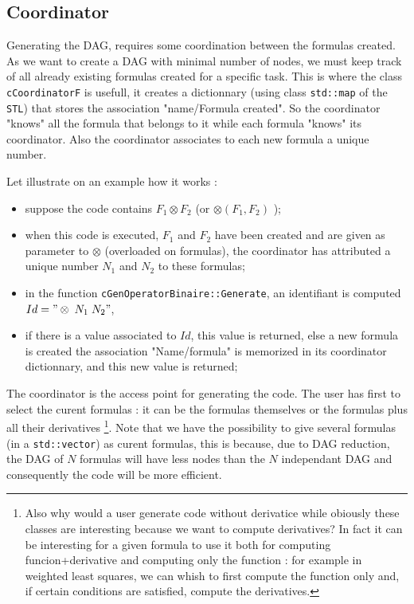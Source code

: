 
\subsection{Coordinator}

Generating the DAG, requires some coordination between the formulas created.
As we want to create a DAG with  minimal number of nodes, we must keep track
of all already existing formulas created for a specific task.
This is where the class {\tt cCoordinatorF} is usefull,  it creates a dictionnary 
(using class {\tt std::map} of the {\tt STL})
that stores the association "name/Formula created".  So the coordinator "knows" all the 
formula that belongs to it while each formula "knows" its coordinator. Also the coordinator
associates to each new formula a unique number.

Let illustrate on an example how it works :

\begin{itemize}
	\item  suppose the code contains  $F_1\otimes F_2$  (or  $\otimes(F_1,F_2)$ );
	\item  when this code is executed, $F_1$ and $F_2$ have been created and are given as
		parameter to $\otimes $ (overloaded on formulas), the coordinator has
		attributed a unique number $N_1$ and $N_2$ to these formulas;
	\item  in the function {\tt cGenOperatorBinaire::Generate}, an identifiant is computed $Id="\otimes \; N_1 \; N_2" $,
	\item  if there is a value associated to $Id$, this value is returned, else a new formula is created 
	       the association "Name/formula" is memorized in its coordinator dictionnary, and this new value is returned;
\end{itemize}

The coordinator  is the access point for generating the code. The user has first to select the curent formulas :
it can be the formulas themselves or the formulas plus all their derivatives
\footnote{
Also why would a user generate code without derivatice while
obiously these classes are interesting because we want to compute derivatives? 
In fact  it can be interesting for a given formula to use it both for  computing funcion+derivative and
computing  only the function : for example in weighted least squares, we can whish to first compute the function
only and, if certain conditions are satisfied, compute the derivatives.
}.
Note that we have the possibility to give several formulas (in a {\tt std::vector}) as curent formulas,
this is because, due to DAG reduction,  the  DAG of $N$ formulas will have less nodes
than the $N$ independant DAG and consequently the code will be more efficient.



